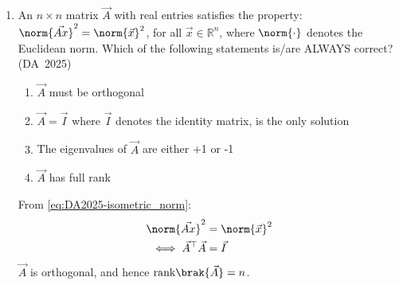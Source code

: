 \begin{enumerate}[label=\thesubsection.\arabic*, ref=\thesubsection.\theenumi]
\begin{itemize}
	\item Uniqueness of critical points: Suppose there exist distinct points $x, y \in \mathbb{R}$ with $x < y$ such that $f'(x) = f'(y) = 0$. Applying Rolle's Theorem \eqref{eq:DA2025-rolles} to the function $g(t) = f'(t)$ on $[x, y]$:
	\begin{align}
		g(x) = g(y) = 0 \implies \exists \, c \in (x, y) \text{ s.t. } g'(c) = f''(c) = 0
	\end{align}
	This contradicts the given condition that $f''(t) > 0$ for all $t \in \mathbb{R}$. Hence, no such pair of points can exist, meaning $f'(x) = 0$ can occur at at most one point.
	
	\item Global and local minima count: For any convex function, any local minimum is necessarily a global minimum. Since $f'(x)$ is strictly increasing, $f'(x) = 0$ has at most one solution, ensuring $f$ has at most one local minimum and at most one global minimum.
\end{itemize}
	\item 
	An $n \times n$ matrix $\vec{A}$ with real entries satisfies the property: $\norm{\vec{Ax}}^2 = \norm{\vec{x}}^2$, for all $\vec{x} \in \mathbb{R}^n$, where $\norm{\cdot}$ denotes the Euclidean norm. Which of the following statements is/are ALWAYS correct?
	\hfill (DA~2025)
	\begin{enumerate}
		\item $\vec{A}$ must be orthogonal
		\item $\vec{A} = \vec{I}$ where $\vec{I}$ denotes the identity matrix, is the only solution
		\item The eigenvalues of $\vec{A}$ are either +1 or -1
		\item $\vec{A}$ has full rank
	\end{enumerate}
	\solution
	From \eqref{eq:DA2025-isometric_norm}:
	\begin{align}
		\norm{\vec{Ax}}^2 &= \norm{\vec{x}}^2
		\\
		\iff \vec{A}^\top\vec{A} &= \vec{I}
	\end{align}
	$\vec{A}$ is orthogonal, and hence $\text{rank}\brak{\vec{A}} = n$.
	

\end{enumerate}
